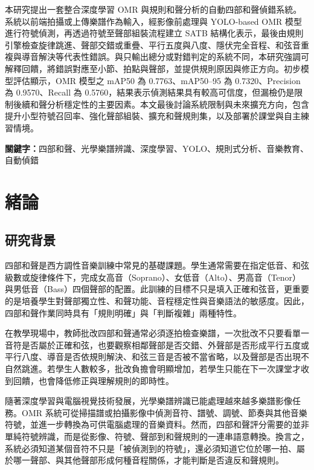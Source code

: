 \documentclass[12pt,a4paper]{article}
\begin{document}
本研究提出一套整合深度學習 OMR 與規則和聲分析的自動四部和聲偵錯系統。系統以前端拍攝或上傳樂譜作為輸入，經影像前處理與 YOLO-based OMR 模型進行符號偵測，再透過符號至聲部組裝流程建立 SATB 結構化表示，最後由規則引擎檢查旋律跳進、聲部交錯或重疊、平行五度與八度、隱伏完全音程、和弦音重複與導音解決等代表性錯誤。與只輸出總分或對錯判定的系統不同，本研究強調可解釋回饋，將錯誤對應至小節、拍點與聲部，並提供規則原因與修正方向。初步模型評估顯示，OMR 模型之 mAP50 為 0.7763、mAP50--95 為 0.7320、Precision 為 0.9570、Recall 為 0.5760，結果表示偵測結果具有較高可信度，但漏檢仍是限制後續和聲分析穩定性的主要因素。本文最後討論系統限制與未來擴充方向，包含提升小型符號召回率、強化聲部組裝、擴充和聲規則集，以及部署於課堂與自主練習情境。

\noindent\textbf{關鍵字：}四部和聲、光學樂譜辨識、深度學習、YOLO、規則式分析、音樂教育、自動偵錯

\newpage
\tableofcontents
\newpage
{}
\listoffigures
\newpage
{}
\listoftables
\newpage

\setcounter{page}{1}

\section{緒論}

\subsection{研究背景}

四部和聲是西方調性音樂訓練中常見的基礎課題。學生通常需要在指定低音、和弦級數或旋律條件下，完成女高音（Soprano）、女低音（Alto）、男高音（Tenor）與男低音（Bass）四個聲部的配置。此訓練的目標不只是填入正確和弦音，更重要的是培養學生對聲部獨立性、和聲功能、音程穩定性與音樂語法的敏感度。因此，四部和聲作業同時具有「規則明確」與「判斷複雜」兩種特性。

在教學現場中，教師批改四部和聲通常必須逐拍檢查樂譜，一次批改不只要看單一音符是否屬於正確和弦，也要觀察相鄰聲部是否交錯、外聲部是否形成平行五度或平行八度、導音是否依規則解決、和弦三音是否被不當省略，以及聲部是否出現不自然跳進。若學生人數較多，批改負擔會明顯增加，若學生只能在下一次課堂才收到回饋，也會降低修正與理解規則的即時性。

隨著深度學習與電腦視覺技術發展，光學樂譜辨識已能處理越來越多樂譜影像任務。OMR 系統可從掃描譜或拍攝影像中偵測音符、譜號、調號、節奏與其他音樂符號，並進一步轉換為可供電腦處理的音樂資料。然而，四部和聲評分需要的並非單純符號辨識，而是從影像、符號、聲部到和聲規則的一連串語意轉換。換言之，系統必須知道某個音符不只是「被偵測到的符號」，還必須知道它位於哪一拍、屬於哪一聲部、與其他聲部形成何種音程關係，才能判斷是否違反和聲規則。
\end{document}
